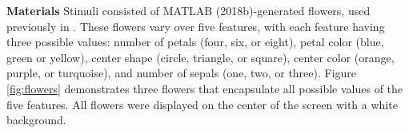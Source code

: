 \documentclass[twocolumn]{svjour3}          %
\begin{document}
\noindent\textbf{Materials }
Stimuli consisted of MATLAB (2018b)-generated flowers, used previously
in \citet{DeBrigard2017}. These flowers vary over five features, with
each feature having three possible values: number of petals (four,
six, or eight), petal color (blue, green or yellow), center shape
(circle, triangle, or square), center color (orange, purple, or
turquoise), and number of sepals (one, two, or three). Figure
\ref{fig:flowers} demonstrates three flowers that encapsulate all
possible values of the five features. All flowers were displayed on
the center of the screen with a white background.
\end{document}
